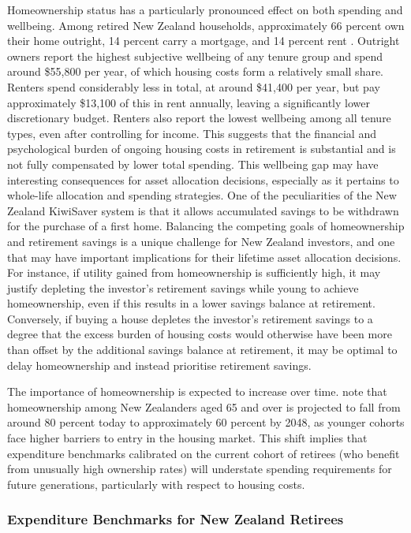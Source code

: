 \documentclass[11pt]{article}
\begin{document}
Homeownership status has a particularly pronounced effect on both spending and wellbeing. Among retired New Zealand households, approximately 66 percent own their home outright, 14 percent carry a mortgage, and 14 percent rent \parencite{le2023expenditure}. Outright owners report the highest subjective wellbeing of any tenure group and spend around \$55,800 per year, of which housing costs form a relatively small share. Renters spend considerably less in total, at around \$41,400 per year, but pay approximately \$13,100 of this in rent annually, leaving a significantly lower discretionary budget. Renters also report the lowest wellbeing among all tenure types, even after controlling for income. This suggests that the financial and psychological burden of ongoing housing costs in retirement is substantial and is not fully compensated by lower total spending. This wellbeing gap may have interesting consequences for asset allocation decisions, especially as it pertains to whole-life allocation and spending strategies. One of the peculiarities of the New Zealand KiwiSaver system is that it allows accumulated savings to be withdrawn for the purchase of a first home. Balancing the competing goals of homeownership and retirement savings is a unique challenge for New Zealand investors, and one that may have important implications for their lifetime asset allocation decisions. For instance, if utility gained from homeownership is sufficiently high, it may justify depleting the investor's retirement savings while young to achieve homeownership, even if this results in a lower savings balance at retirement. Conversely, if buying a house depletes the investor's retirement savings to a degree that the excess burden of housing costs would otherwise have been more than offset by the additional savings balance at retirement, it may be optimal to delay homeownership and instead prioritise retirement savings.

The importance of homeownership is expected to increase over time. \textcite{riig2024spending} note that homeownership among New Zealanders aged 65 and over is projected to fall from around 80 percent today to approximately 60 percent by 2048, as younger cohorts face higher barriers to entry in the housing market. This shift implies that expenditure benchmarks calibrated on the current cohort of retirees (who benefit from unusually high ownership rates) will understate spending requirements for future generations, particularly with respect to housing costs.

\subsubsection{Expenditure Benchmarks for New Zealand Retirees}
\end{document}
